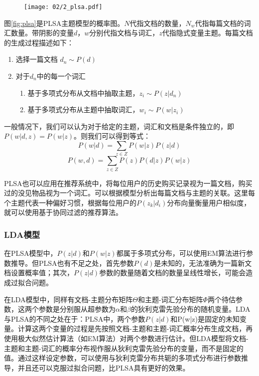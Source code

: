 \begin{figure}
 \centering
 \texttt{[image: 02/2\_plsa.pdf]}
\end{figure}

图\ref{fig:plsa}是PLSA主题模型的概率图。$N$代指文档的数量，$N_w$代指每篇文档的词汇数量。带阴影的变量$d$，$w$分别代指文档与词汇，$z$代指隐式变量主题。每篇文档的生成过程描述如下：

\begin{enumerate}
\item 选择一篇文档 $d_n \sim P(d)$
\item 对于$d_n$中的每一个词汇
       \begin{enumerate}[fullwidth,itemindent=1em,label=(\alph*)]
       \item 基于多项式分布从文档中抽取主题，$z_i \sim P(z|d_n)$
       \item 基于多项式分布从主题中抽取词汇，$w_i \sim P(w|z_i)$
       \end{enumerate}
\end{enumerate}

一般情况下，我们可以认为对于给定的主题，词汇和文档是条件独立的，即$P(w|d,z) = P(w|z)$。则我们可以得到等式：
\begin{equation}
	P(w|d) = \sum_{z\in Z}P(w|z)P(z|d)
\end{equation}
\begin{equation}
	P(w,d) = \sum_{z\in Z}P(z)P(d|z)P(w|z)
\end{equation}

PLSA也可以应用在推荐系统中，将每位用户的历史购买记录视为一篇文档，购买过的没见物品视为一个词汇。可以根据模型分析出每篇文档与主题的关联。这里每个主题代表一种偏好习惯，根据每位用户的$P(z_k|d_i)$分布向量衡量用户相似度，就可以使用基于协同过滤的推荐算法。

\subsubsection{LDA模型}

在PLSA模型中，$P(z|d)$和$P(w|z)$都属于多项式分布，可以使用EM算法进行参数推导。但PLSA也有不足之处，首先参数$P(d)$是未知的，无法准确为一篇新文档设置概率值；其次，$P(z|d)$参数的数量随着文档的数量呈线性增长，可能会造成过拟合问题。

在LDA\cite{blei2003latent}模型中，同样有文档-主题分布矩阵$\Theta$和主题-词汇分布矩阵$\Phi$两个待估参数，这两个参数是分别服从超参数为$\alpha$和$\beta$的狄利克雷先验分布的随机变量。LDA与PLSA的不同之处在于：PLSA中，两个参数$P(z|d)$和P(w|z)是固定的未知变量。计算这两个变量的过程是先按照文档-主题和主题-词汇概率分布生成文档，再使用极大似然估计算法（如EM算法）对两个参数进行估计。但LDA模型将文档-主题和主题-词汇的概率分布视作服从狄利克雷先验分布的变量，而不是固定的值。通过这样设定参数，可以使用与狄利克雷分布共轭的多项式分布进行参数推导，并且还可以克服过拟合问题，比PLSA具有更好的效果。

